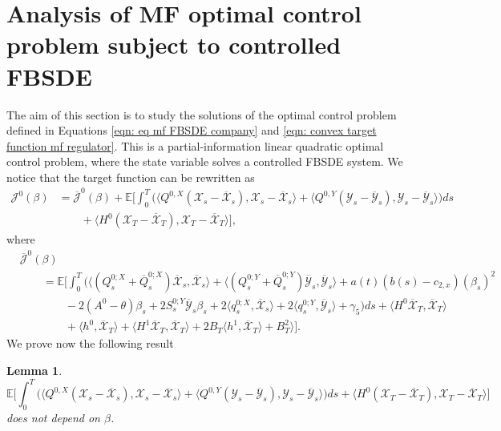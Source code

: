 \documentclass[11pt,twoside]{amsart}
\newtheorem{lemma}[theorem]{Lemma}
\theoremstyle{definition}
\numberwithin{equation}{section}
\newcommand{\E}{\mathbb{E}}
\renewcommand{\bar}{\overline}
\begin{document}
 








\section{Analysis of MF optimal control problem subject to controlled FBSDE}\label{section_solution_MF_regulator_cpo}

The aim of this section is to study the solutions of the optimal control problem defined in Equations \eqref{eqn: eq mf FBSDE company} and \eqref{eqn: convex target function mf regulator}. This is a partial-information linear quadratic optimal control problem, where the state variable solves a controlled FBSDE system. We notice that the target function can be rewritten as 
\begin{align*}
    \mathcal{J}^0(\beta)    &= \bar{\mathcal{J}}^0(\beta) + \E\bigg[\int_0^T\bigg( \langle Q^{0,X}(\mathcal{X}_s - \bar{\mathcal{X}}_s), \mathcal{X}_s - \bar{\mathcal{X}}_s\rangle + \langle Q^{0,Y}(\mathcal{Y}_s - \bar{\mathcal{Y}}_s), \mathcal{Y}_s - \bar{\mathcal{Y}}_s\rangle \bigg) ds \\
    &\qquad+ \langle H^0 ( \mathcal{X}_T - \bar{\mathcal{X}}_T), \mathcal{X}_T - \bar{\mathcal{X}}_T\rangle \bigg],
\end{align*}
where 
\begin{align}
    &\label{eqn: convex target function mf regulator projected}
    \bar{\mathcal{J}}^0(\beta) \\
    &\nonumber\qquad = \E\Bigg[ \int_0^T \bigg(\langle (Q^{0;X}_s + \bar{Q}^{0;X}_s) \bar{\mathcal{X}}_s,\bar{\mathcal{X}}_s\rangle+\langle (Q^{0;Y}_s + \bar{Q}^{0;Y}_s) \bar{\mathcal{Y}}_s,\bar{\mathcal{Y}}_s\rangle +a(t)(b(s) -  c_{2,x})( \beta_s)^2\\
    &\nonumber\qquad \qquad-2(A^0 - \theta)\beta_s  + 2  S^{0;Y}_s \bar{\mathcal{Y}}_s  \beta_s  + 2 \langle q^{0;X}_s , \bar{\mathcal{X}}_s\rangle + 2 \langle q^{0;Y}_s ,\bar{\mathcal{Y}}_s\rangle + \gamma_5\bigg) ds + \langle H^0  \bar{\mathcal{X}}_T , \bar{\mathcal{X}}_T\rangle \\
    &\nonumber\qquad\qquad + \langle h^0, \bar{\mathcal{X}}_T\rangle+ \langle H^1\bar{\mathcal{X}}_T, \bar{\mathcal{X}}_T\rangle + 2B_T \langle h^1, \bar{\mathcal{X}}_T\rangle + B^2_T\rangle\Bigg].
\end{align}
We prove now the following result
\begin{lemma}
\label{lemma: filtering error independent of control}
\begin{equation*}\E\bigg[\int_0^T\bigg( \langle Q^{0,X}(\mathcal{X}_s - \bar{\mathcal{X}}_s), \mathcal{X}_s - \bar{\mathcal{X}}_s\rangle + \langle Q^{0,Y}(\mathcal{Y}_s - \bar{\mathcal{Y}}_s), \mathcal{Y}_s - \bar{\mathcal{Y}}_s\rangle \bigg) ds + \langle H^0  (\mathcal{X}_T - \bar{\mathcal{X}}_T), \mathcal{X}_T - \bar{\mathcal{X}}_T\rangle \bigg]
\end{equation*}
does not depend on $\beta$.
\end{lemma}
\end{document}
